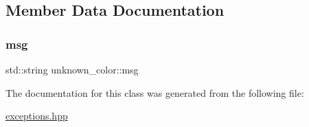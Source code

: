 \subsection{Member Data Documentation}
\mbox{\label{classunknown__color_a17bf517ff68841e8aac49dd58035c6a7}} 
\subsubsection{\texorpdfstring{msg}{msg}}
{\footnotesize\ttfamily std\+::string unknown\+\_\+color\+::msg\hspace{0.3cm}{\ttfamily [private]}}



The documentation for this class was generated from the following file\+:\begin{DoxyCompactItemize}
\item 
\hyperlink{exceptions_8hpp}{exceptions.\+hpp}\end{DoxyCompactItemize}

